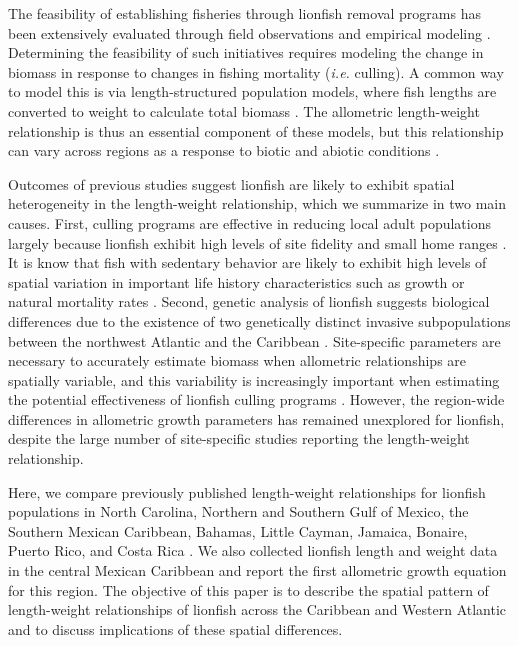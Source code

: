 \documentclass[fleqn,10pt,lineno]{wlpeerj} %
\begin{document}
The feasibility of establishing fisheries through lionfish removal
programs has been extensively evaluated through field observations and
empirical modeling
\citep{barbour_2011,morris_2011,deleon_2013,johnston_2015,sandel_2015,usseglio_2017}.
Determining the feasibility of such initiatives requires modeling the
change in biomass in response to changes in fishing mortality
(\emph{i.e.} culling). A common way to model this is via
length-structured population models, where fish lengths are converted to
weight to calculate total biomass
\citep{barbour_2011,cote_2014,andradibrown_2017}. The allometric
length-weight relationship is thus an essential component of these
models, but this relationship can vary across regions as a response to
biotic and abiotic conditions \citep{johnson_2016}.

Outcomes of previous studies suggest lionfish are likely to exhibit
spatial heterogeneity in the length-weight relationship, which we
summarize in two main causes. First, culling programs are effective in
reducing local adult populations largely because lionfish exhibit high
levels of site fidelity and small home ranges
\citep{Fishelson_1997,kochzius_2005,jud_2012,cote_2014}. It is know that
fish with sedentary behavior are likely to exhibit high levels of
spatial variation in important life history characteristics such as
growth or natural mortality rates
\citep{gunderson_2008,hutchinson_2008,wilson_2012,guan_2013}. Second,
genetic analysis of lionfish suggests biological differences due to the
existence of two genetically distinct invasive subpopulations between
the northwest Atlantic and the Caribbean \citep{betancurr_2011}.
Site-specific parameters are necessary to accurately estimate biomass
when allometric relationships are spatially variable, and this
variability is increasingly important when estimating the potential
effectiveness of lionfish culling programs
\citep{barbour_2011,morris_2011,cote_2014,johnston_2015}. However, the
region-wide differences in allometric growth parameters has remained
unexplored for lionfish, despite the large number of site-specific
studies reporting the length-weight relationship.

Here, we compare previously published length-weight relationships for
lionfish populations in North Carolina, Northern and Southern Gulf of
Mexico, the Southern Mexican Caribbean, Bahamas, Little Cayman, Jamaica,
Bonaire, Puerto Rico, and Costa Rica
\citep{barbour_2011,darling_2011,deleon_2013,fogg_2013,dahl_2014,edwards_2014,toledohernndez_2014,sandel_2015,aguilarperera_2016,sabidoitza_2016,sabidoitz_2016,chin_2016}.
We also collected lionfish length and weight data in the central Mexican
Caribbean and report the first allometric growth equation for this
region. The objective of this paper is to describe the spatial pattern
of length-weight relationships of lionfish across the Caribbean and
Western Atlantic and to discuss implications of these spatial
differences.
\end{document}
